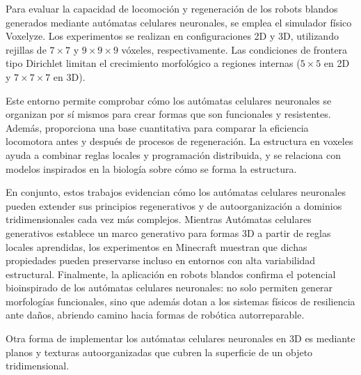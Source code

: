 Para evaluar la capacidad de locomoción y regeneración de los robots blandos generados mediante autómatas celulares neuronales, se emplea el simulador físico Voxelyze. Los experimentos se realizan en configuraciones 2D y 3D, utilizando rejillas de $7 \times 7$ y $9 \times 9 \times 9$ vóxeles, respectivamente. Las condiciones de frontera tipo Dirichlet limitan el crecimiento morfológico a regiones internas ($5 \times 5$ en 2D y $7 \times 7 \times 7$ en 3D).

Este entorno permite comprobar cómo los autómatas celulares neuronales se organizan por sí mismos para crear formas que son funcionales y resistentes. Además, proporciona una base cuantitativa para comparar la eficiencia locomotora antes y después de procesos de regeneración. La estructura en voxeles ayuda a combinar reglas locales y programación distribuida, y se relaciona con modelos inspirados en la biología sobre cómo se forma la estructura.

En conjunto, estos trabajos evidencian cómo los autómatas celulares neuronales pueden extender sus principios regenerativos y de autoorganización a dominios tridimensionales cada vez más complejos. Mientras Autómatas celulares generativos establece un marco generativo para formas 3D a partir de reglas locales aprendidas, los experimentos en Minecraft muestran que dichas propiedades pueden preservarse incluso en entornos con alta variabilidad estructural. Finalmente, la aplicación en robots blandos confirma el potencial bioinspirado de los autómatas celulares neuronales: no solo permiten generar morfologías funcionales, sino que además dotan a los sistemas físicos de resiliencia ante daños, abriendo camino hacia formas de robótica autorreparable.

Otra forma de implementar los autómatas celulares neuronales en 3D es mediante planos y texturas autoorganizadas que cubren la superficie de un objeto tridimensional. 